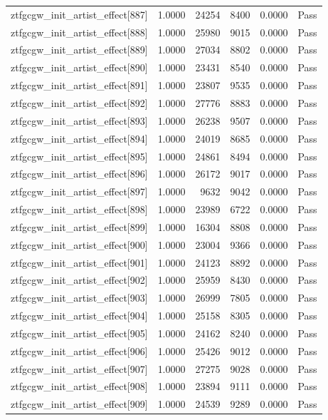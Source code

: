 \begin{table}[htbp]
\begin{tabular}{llrrll}
ztfgcgw\_init\_artist\_effect[887] & 1.0000 & 24254 & 8400 & 0.0000 & Pass \\
ztfgcgw\_init\_artist\_effect[888] & 1.0000 & 25980 & 9015 & 0.0000 & Pass \\
ztfgcgw\_init\_artist\_effect[889] & 1.0000 & 27034 & 8802 & 0.0000 & Pass \\
ztfgcgw\_init\_artist\_effect[890] & 1.0000 & 23431 & 8540 & 0.0000 & Pass \\
ztfgcgw\_init\_artist\_effect[891] & 1.0000 & 23807 & 9535 & 0.0000 & Pass \\
ztfgcgw\_init\_artist\_effect[892] & 1.0000 & 27776 & 8883 & 0.0000 & Pass \\
ztfgcgw\_init\_artist\_effect[893] & 1.0000 & 26238 & 9507 & 0.0000 & Pass \\
ztfgcgw\_init\_artist\_effect[894] & 1.0000 & 24019 & 8685 & 0.0000 & Pass \\
ztfgcgw\_init\_artist\_effect[895] & 1.0000 & 24861 & 8494 & 0.0000 & Pass \\
ztfgcgw\_init\_artist\_effect[896] & 1.0000 & 26172 & 9017 & 0.0000 & Pass \\
ztfgcgw\_init\_artist\_effect[897] & 1.0000 & 9632 & 9042 & 0.0000 & Pass \\
ztfgcgw\_init\_artist\_effect[898] & 1.0000 & 23989 & 6722 & 0.0000 & Pass \\
ztfgcgw\_init\_artist\_effect[899] & 1.0000 & 16304 & 8808 & 0.0000 & Pass \\
ztfgcgw\_init\_artist\_effect[900] & 1.0000 & 23004 & 9366 & 0.0000 & Pass \\
ztfgcgw\_init\_artist\_effect[901] & 1.0000 & 24123 & 8892 & 0.0000 & Pass \\
ztfgcgw\_init\_artist\_effect[902] & 1.0000 & 25959 & 8430 & 0.0000 & Pass \\
ztfgcgw\_init\_artist\_effect[903] & 1.0000 & 26999 & 7805 & 0.0000 & Pass \\
ztfgcgw\_init\_artist\_effect[904] & 1.0000 & 25158 & 8305 & 0.0000 & Pass \\
ztfgcgw\_init\_artist\_effect[905] & 1.0000 & 24162 & 8240 & 0.0000 & Pass \\
ztfgcgw\_init\_artist\_effect[906] & 1.0000 & 25426 & 9012 & 0.0000 & Pass \\
ztfgcgw\_init\_artist\_effect[907] & 1.0000 & 27275 & 9028 & 0.0000 & Pass \\
ztfgcgw\_init\_artist\_effect[908] & 1.0000 & 23894 & 9111 & 0.0000 & Pass \\
ztfgcgw\_init\_artist\_effect[909] & 1.0000 & 24539 & 9289 & 0.0000 & Pass \\

\end{tabular}
\end{table}
